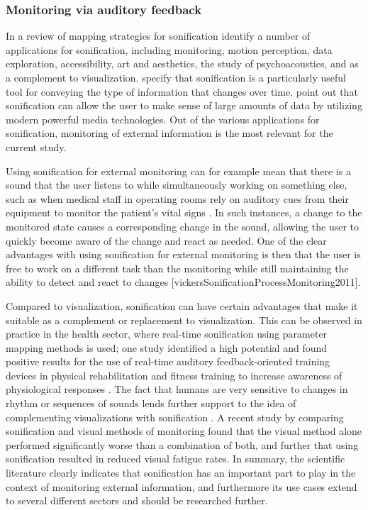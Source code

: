 \documentclass[10pt,a4paper,onecolumn]{article}
\begin{document}
\hypertarget{monitoring-via-auditory-feedback}{%
\subsubsection{Monitoring via auditory feedback}\label{monitoring-via-auditory-feedback}}

In a review of mapping strategies for sonification \textcite{dubusSystematicReviewMapping2013} identify a number of applications for sonification, including monitoring, motion perception, data exploration, accessibility, art and aesthetics, the study of psychoacoustics, and as a complement to visualization. \textcite{debashiSonificationNetworkTraffic2018} specify that sonification is a particularly useful tool for conveying the type of information that changes over time. \textcite{kramerSonificationReportStatus1999} point out that sonification can allow the user to make sense of large amounts of data by utilizing modern powerful media technologies. Out of the various applications for sonification, monitoring of external information is the most relevant for the current study.

Using sonification for external monitoring can for example mean that there is a sound that the user listens to while simultaneously working on something else, such as when medical staff in operating rooms rely on auditory cues from their equipment to monitor the patient's vital signs \autocite{dubusInteractiveSonificationMotion2013}. In such instances, a change to the monitored state causes a corresponding change in the sound, allowing the user to quickly become aware of the change and react as needed. One of the clear advantages with using sonification for external monitoring is then that the user is free to work on a different task than the monitoring while still maintaining the ability to detect and react to changes {[}vickersSonificationProcessMonitoring2011{]}.

Compared to visualization, sonification can have certain advantages that make it suitable as a complement or replacement to visualization. This can be observed in practice in the health sector, where real-time sonification using parameter mapping methods is used; one study identified a high potential and found positive results for the use of real-time auditory feedback-oriented training devices in physical rehabilitation and fitness training to increase awareness of physiological responses \autocite{yangRealtimeSonificationBiceps2015}. The fact that humans are very sensitive to changes in rhythm or sequences of sounds lends further support to the idea of complementing visualizations with sonification \autocite{hildebrandtShortPaperEnhancing2014}. A recent study by \textcite{debashiSonificationNetworkTraffic2018} comparing sonification and visual methods of monitoring found that the visual method alone performed significantly worse than a combination of both, and further that using sonification resulted in reduced visual fatigue rates. In summary, the scientific literature clearly indicates that sonification has an important part to play in the context of monitoring external information, and furthermore its use cases extend to several different sectors and should be researched further.
\end{document}
